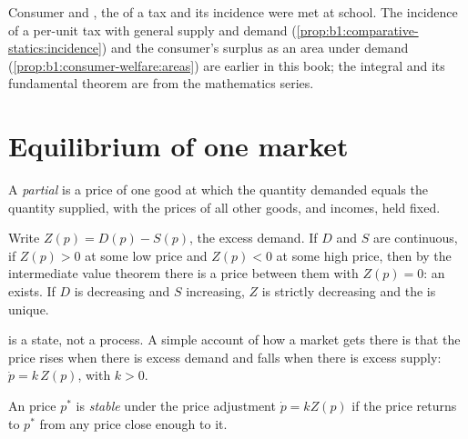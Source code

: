 \begin{recall}
Consumer and , the  of a tax and its
incidence were met at school. The incidence of a per-unit tax with general
supply and demand (\cref{prop:b1:comparative-statics:incidence}) and the
consumer's surplus as an area under demand
(\cref{prop:b1:consumer-welfare:areas}) are earlier in this book; the
integral and its fundamental theorem are from the mathematics series.
\end{recall}

\section{Equilibrium of one market}\label{sec:b1:partial-equilibrium-welfare:equilibrium}

\begin{definition}\label{def:b1:partial-equilibrium-welfare:partial}
A \emph{partial } is a price of one good at which the quantity
demanded equals the quantity supplied, with the prices of all other goods,
and incomes, held fixed.
\end{definition}

Write $Z(p) = D(p) - S(p)$, the excess demand. If $D$ and $S$ are continuous, if
$Z(p) > 0$ at some low price and $Z(p) < 0$ at some high price, then by the
intermediate value theorem there is a price between them with $Z(p) = 0$: an
 exists. If $D$ is decreasing and $S$ increasing, $Z$ is strictly
decreasing and the  is unique.

 is a state, not a process. A simple account of how a market
gets there is that the price rises when there is excess demand and falls
when there is excess supply: $\dot p = k\,Z(p)$, with $k > 0$.

\begin{definition}\label{def:b1:partial-equilibrium-welfare:stable}
An  price $p^*$ is \emph{stable} under the price adjustment
$\dot p = kZ(p)$ if the price returns to $p^*$ from any price close enough to
it.
\end{definition}

